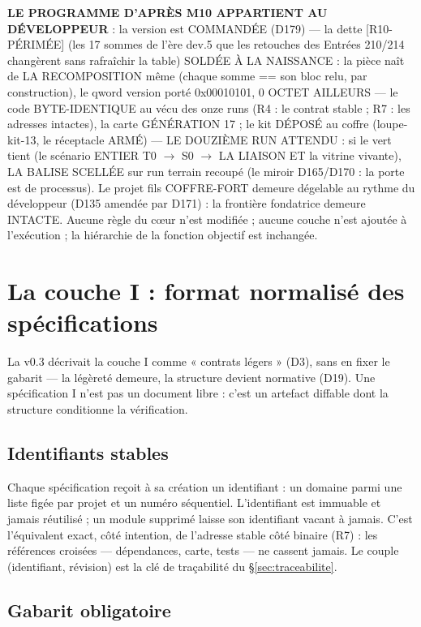 \textbf{LE PROGRAMME D'APRÈS M10 APPARTIENT AU DÉVELOPPEUR} : la version
 est COMMANDÉE (D179) — la dette [R10-PÉRIMÉE] (les 17 sommes de
l'ère dev.5 que les retouches des Entrées 210/214 changèrent sans rafraîchir la
table) SOLDÉE À LA NAISSANCE : la pièce naît de LA RECOMPOSITION même (chaque
somme == son bloc relu, par construction), le qword version porté 0x00010101,
0 OCTET AILLEURS — le code BYTE-IDENTIQUE au vécu des onze runs (R4 : le contrat
stable ; R7 : les adresses intactes), la carte GÉNÉRATION 17 ; le kit
 DÉPOSÉ au coffre  (loupe-kit-13, le réceptacle
ARMÉ) — LE DOUZIÈME RUN ATTENDU : si le vert tient (le scénario ENTIER
T0 $\to$ S0 $\to$ LA LIAISON ET la vitrine vivante), LA BALISE
 SCELLÉE sur run terrain recoupé (le miroir D165/D170 : la porte
est de processus). Le projet fils COFFRE-FORT demeure dégelable au rythme du
développeur (D135 amendée par D171) : la frontière fondatrice demeure INTACTE.
Aucune règle du cœur n'est modifiée ; aucune couche n'est ajoutée à l'exécution ;
la hiérarchie de la fonction objectif est inchangée.

\section{La couche I : format normalisé des spécifications}\label{sec:coucheI}

La v0.3 décrivait la couche I comme « contrats légers » (D3), sans en fixer le gabarit —
la légèreté demeure, la structure devient normative (D19). Une spécification I n’est pas un
document libre : c’est un artefact diffable dont la structure conditionne la vérification.

\subsection{Identifiants stables}

Chaque spécification reçoit à sa création un identifiant  : un domaine
parmi une liste figée par projet et un numéro séquentiel. L’identifiant est immuable et
jamais réutilisé ; un module supprimé laisse son identifiant vacant à jamais. C’est
l’équivalent exact, côté intention, de l’adresse stable côté binaire (R7) : les références
croisées — dépendances, carte, tests — ne cassent jamais. Le couple (identifiant,
révision) est la clé de traçabilité du §\ref{sec:traceabilite}.

\subsection{Gabarit obligatoire}

